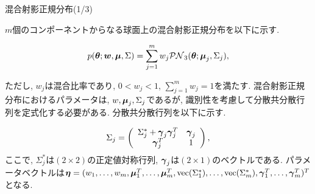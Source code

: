 \documentclass[dvipdfmx]{beamer} %
\newcommand{\bm}[1]{\mbox{\boldmath $#1$}}
\begin{document}
\begin{frame}{混合射影正規分布(1/3)}

$m$個のコンポーネントからなる球面上の混合射影正規分布を以下に示す. 

\vspace{-0.3cm}
\begin{eqnarray*}
\label{MPNS}
p(\bm \theta;\bm w,\bm \mu, \Sigma) = \sum^m_{j=1} w_j \mathcal{PN}_3(\bm \theta;\bm \mu_j, \Sigma_j),
\end{eqnarray*}

\noindent
ただし, $w_j$は混合比率であり, $0 < w_j < 1$, $\sum^m_{j=1} w_j = 1$を満たす. 混合射影正規分布におけるパラメータは, $w, \bm \mu_j, \Sigma_j$であるが, 識別性を考慮して分散共分散行列を定式化する必要がある. 分散共分散行列を以下に示す.

\vspace{-0.3cm}
\begin{eqnarray*}
\label{SIGMA}
 \Sigma_j = \left(
    \begin{array}{cc}
      \Sigma^*_j + \bm \gamma_j \bm \gamma_j^T & \bm \gamma_j \\
      \bm \gamma_j^T & 1
    \end{array}
  \right),
\end{eqnarray*}
\noindent
ここで, $\Sigma^*_j$は$(2 \times 2)$の正定値対称行列, $\bm \gamma_j$は$(2 \times 1)$のベクトルである. パラメータベクトルは$\bm \eta = (w_1, \dots, w_m, \bm \mu_1^T, \dots, \bm \mu_m^T, \mbox{vec}(\Sigma^*_1), \dots, \mbox{vec}(\Sigma^*_m), \bm \gamma_1^T, \dots, \bm \gamma_m^T)^T$となる.

\end{frame}
\end{document}
